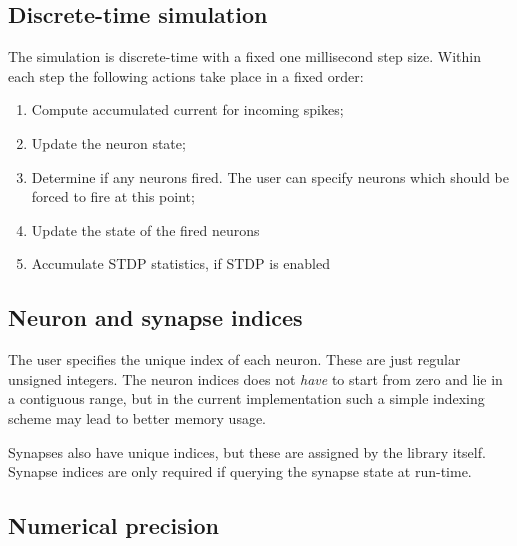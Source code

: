 \documentclass[a4paper]{article}
\begin{document}



\subsection{Discrete-time simulation}
\label{model:step}

The simulation is discrete-time with a fixed one millisecond step size.
Within each step the following actions take place in a fixed order:

\begin{enumerate}
	\item Compute accumulated current for incoming spikes;
	\item Update the neuron state;
	\item Determine if any neurons fired. The user can specify neurons which should be forced to fire at this point;
	\item Update the state of the fired neurons
	\item Accumulate STDP statistics, if STDP is enabled
\end{enumerate}

\subsection{Neuron and synapse indices}

The user specifies the unique index of each neuron.
These are just regular unsigned integers.
The neuron indices does not \emph{have} to start from zero and lie in a contiguous range, 
	but in the current implementation such a simple indexing scheme may lead to better memory usage.

Synapses also have unique indices, but these are assigned by the library itself.
Synapse indices are only required if querying the synapse state at run-time.

\subsection{Numerical precision}
\end{document}
